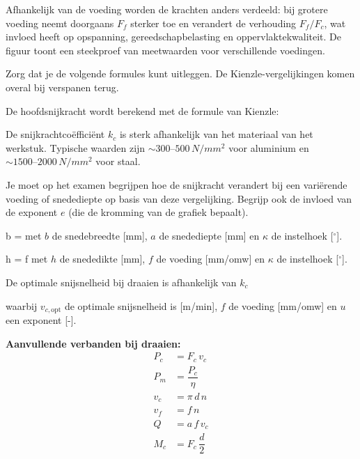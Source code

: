 \documentclass[a4paper,11pt,twoside]{report}
\begin{document}
Afhankelijk van de voeding worden de krachten anders verdeeld:
bij grotere voeding neemt doorgaans $F_f$ sterker toe en verandert de verhouding $F_f/F_c$,
wat invloed heeft op opspanning, gereedschapbelasting en oppervlaktekwaliteit.
De figuur toont een steekproef van meetwaarden voor verschillende voedingen.

\begin{examenbox}
    Zorg dat je de volgende formules kunt uitleggen. De Kienzle-vergelijkingen komen overal
    bij verspanen terug.
\end{examenbox}

De hoofdsnijkracht wordt berekend met de formule van Kienzle:



De snijkrachtcoëfficiënt $k_c$ is sterk afhankelijk van het materiaal van het werkstuk.
Typische waarden zijn $\sim 300\text{--}500\,\si{N/mm^2}$ voor aluminium
en $\sim 1500\text{--}2000\,\si{N/mm^2}$ voor staal.

\begin{examenbox}
    Je moet op het examen begrijpen hoe de snijkracht verandert bij een variërende voeding of snedediepte op
    basis van deze vergelijking.
    Begrijp ook de invloed van de exponent $e$ (die de kromming van de grafiek bepaalt).
\end{examenbox}

{b = }{met $b$ de snedebreedte [\si{mm}], $a$ de snedediepte [\si{mm}] en $\kappa$ de
    instelhoek [$^\circ$].}

{h = f \cdot \sin \kappa}{met $h$ de snededikte [\si{mm}], $f$ de voeding [\si{mm/omw}] en $\kappa$ de
    instelhoek [$^\circ$].}

De optimale snijsnelheid bij draaien is afhankelijk van $k_c$

{waarbij $v_{c,\mathrm{opt}}$ de optimale snijsnelheid is [\si{m/min}], $f$ de voeding [\si{mm/omw}] en $u$ een exponent [-].}


\textbf{Aanvullende verbanden bij draaien:}
\[
    \begin{aligned}
        P_c & = F_c\,v_c          \\
        P_m & = \dfrac{P_c}{\eta} \\
        v_c & = \pi\,d\,n         \\
        v_f & = f\,n              \\
        Q   & = a\,f\,v_c         \\
        M_c & = F_c\,\dfrac{d}{2}
    \end{aligned}
\]
\end{document}

